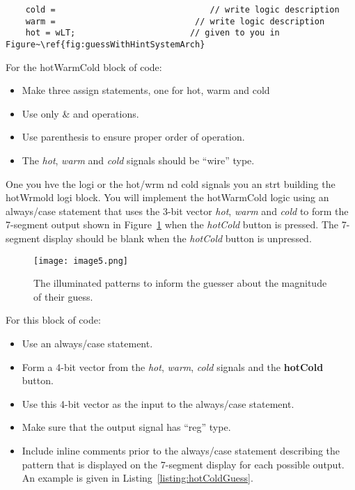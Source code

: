 \protect\hypertarget{hotWarmCold_Logic}{}{}
\begin{verbatim}
    cold =                               // write logic description
    warm =                            // write logic description
    hot = wLT;                       // given to you in  Figure~\ref{fig:guessWithHintSystemArch}
\end{verbatim}

For the hotWarmCold block of code:

\begin{itemize}
    \item
        Make three assign statements, one for hot, warm and cold
    \item
        Use only \& and \textbar{} operations.
    \item
        Use parenthesis to ensure proper order of operation.
    \item
        The \emph{hot}, \emph{warm} and \emph{cold} signals should be ``wire''
        type.
\end{itemize}

One you hve the logi or the hot/wrm nd cold signals you an strt building the
hotWrmold logi block.
You will implement the hotWarmCold logic using an always/case statement
that uses the 3-bit vector \emph{hot}, \emph{warm} and \emph{cold} to form
the 7-segment output shown in Figure~\ref{figure:hiLoHintSevenSeg} when
the \emph{hotCold} button is pressed. The 7-segment display should be blank
when the \emph{hotCold} button is unpressed.

\begin{figure}[ht]
    \texttt{[image:  image5.png]}
    \caption{The illuminated patterns to inform the guesser about the magnitude of their guess.}
    \label{figure:hiLoHintSevenSeg}
\end{figure}

For this block of code:

\begin{itemize}
    \item
        Use an always/case statement.
    \item
        Form a 4-bit vector from the \emph{hot}, \emph{warm}, \emph{cold}
        signals and the \textbf{hotCold} button.
    \item
        Use this 4-bit vector as the input to the always/case statement.
    \item
        Make sure that the output signal has ``reg'' type.
    \item
        Include inline comments prior to the always/case statement describing
        the pattern that is displayed on the 7-segment display for each
        possible output. An example is given in Listing~\ref{listing:hotColdGuess}.
\end{itemize}

